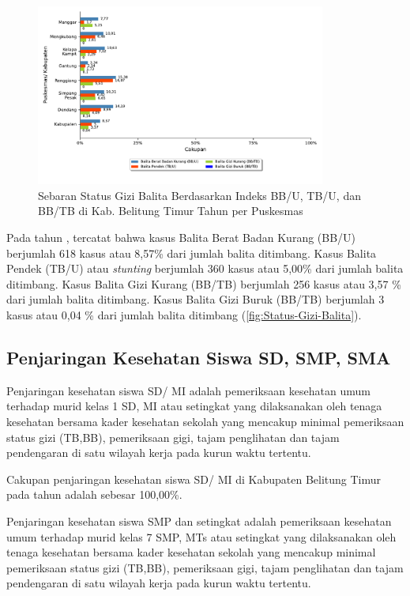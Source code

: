 \begin{figure}[H]
  \centering
  \includegraphics[width=0.85\textwidth]{bab_05/bab_05_25_statusGiziBalita}
  \caption{Sebaran Status Gizi Balita Berdasarkan Indeks BB/U, TB/U, dan BB/TB di Kab. Belitung Timur Tahun \tP per
Puskesmas}
  \label{fig:Status-Gizi-Balita}
\end{figure}

Pada tahun \tP, tercatat bahwa kasus Balita Berat Badan Kurang (BB/U) berjumlah 618 kasus atau 8,57\% dari jumlah balita ditimbang.
Kasus Balita Pendek (TB/U) atau \textit{stunting} berjumlah 360 kasus atau 5,00\% dari jumlah balita ditimbang.
Kasus Balita Gizi Kurang (BB/TB) berjumlah 256 kasus atau 3,57 \% dari jumlah balita ditimbang.
Kasus Balita Gizi Buruk (BB/TB) berjumlah 3 kasus atau 0,04 \% dari jumlah balita ditimbang (\autoref{fig:Status-Gizi-Balita}).

\subsection{Penjaringan Kesehatan Siswa SD, SMP, SMA}
Penjaringan kesehatan siswa SD/ MI adalah pemeriksaan kesehatan umum terhadap murid kelas 1 SD, MI atau setingkat yang dilaksanakan oleh tenaga kesehatan bersama kader kesehatan sekolah yang mencakup minimal pemeriksaan status gizi (TB,BB), pemeriksaan gigi, tajam penglihatan dan tajam pendengaran di satu wilayah kerja pada kurun waktu tertentu.

Cakupan penjaringan kesehatan siswa SD/ MI di Kabupaten Belitung Timur pada tahun \tP adalah sebesar 100,00\%.

Penjaringan kesehatan siswa SMP dan setingkat adalah pemeriksaan kesehatan umum terhadap murid kelas 7 SMP, MTs atau setingkat yang dilaksanakan oleh tenaga kesehatan bersama kader kesehatan sekolah yang mencakup minimal pemeriksaan status gizi (TB,BB), pemeriksaan gigi, tajam penglihatan dan tajam pendengaran di satu wilayah kerja pada kurun waktu tertentu.

